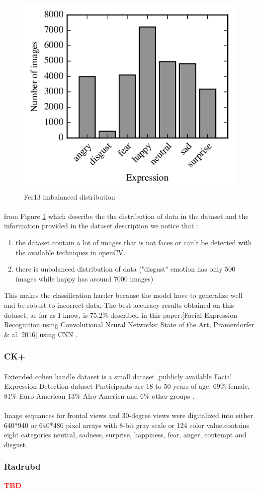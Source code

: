 \begin{figure}
	\centering
	\includegraphics[width=.5\textwidth]{images/fer_dis.png}
	\caption{Fer13 imbalanced distribution}
	\label{fig:fer13}
\end{figure} 
\paragraph{}
from Figure \ref{fig:fer13} which describe the the distribution of data in the dataset and the information provided in the dataset description we notice that :
\begin{enumerate}
	\item the dataset contain a lot of images that is not faces or can't be detected with the available techniques in openCV.
	\item there is unbalanced distribution of data ("disgust" emotion has only 500 images while happy has around 7000 images)   
\end{enumerate}

 This makes the classification harder because the model have to generalize well and be robust to incorrect data, The best accuracy results obtained on this dataset, as far as I know, is 75.2\% described in this paper:\cite{state_of_art}[Facial Expression Recognition using Convolutional Neural Networks: State of the Art, Pramerdorfer \& al. 2016] using CNN .

\subsubsection{CK+}
\paragraph{}
Extended cohen kandle dataset is a small dataset ,publicly available Facial Expression Detection dataset Participants are 18 to 50 years of age, 69\% female, 81\% Euro-American 
13\% Afro-Americn and 6\% other groups .
\paragraph{}
Image sequances for frontal views and 30-degree views were digitalized into either 640*940 or 640*480 pixel arrays with 8-bit gray scale or 124 color value.contains eight categories neutral, sadness, surprise, happiness, fear, anger, contempt and disgust.	

\subsubsection{Radrubd}
\textcolor{red}{\textbf{TBD}}

